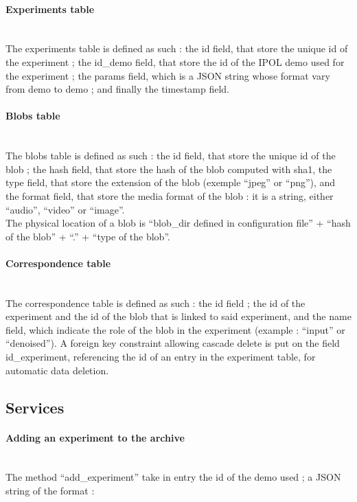 \paragraph{Experiments table} \hspace{0pt} \\
The experiments table is defined as such : the id field, that store the unique id of the experiment ; the id\_demo field, that store the id of the IPOL demo used for the experiment ; the params field, which is a JSON string whose format vary from demo to demo ; and finally the timestamp field.

\paragraph{Blobs table} \hspace{0pt} \\
The blobs table is defined as such : the id field, that store the unique id of the blob ; the hash field, that store the hash of the blob computed with sha1, the type field, that store the extension of the blob (exemple ``jpeg'' or ``png''), and the format field, that store the media format of the blob : it is a string, either ``audio'', ``video'' or ``image''. \\
The physical location of a blob is ``blob\_dir defined in configuration file'' + ``hash of the blob'' + ``.'' + ``type of the blob''.

\paragraph{Correspondence table} \hspace{0pt} \\
The correspondence table is defined as such : the id field ; the id of the experiment and the id of the blob that is linked to said experiment, and the name field, which indicate the role of the blob in the experiment (example : ``input'' or ``denoised''). A foreign key constraint allowing cascade delete is put on the field id\_experiment, referencing the id of an entry in the experiment table, for automatic data deletion.

\subsection{Services}

\paragraph{Adding an experiment to the archive} \hspace{0pt} \\
The method ``add\_experiment'' take in entry the id of the demo used ; a JSON string of the format : 

